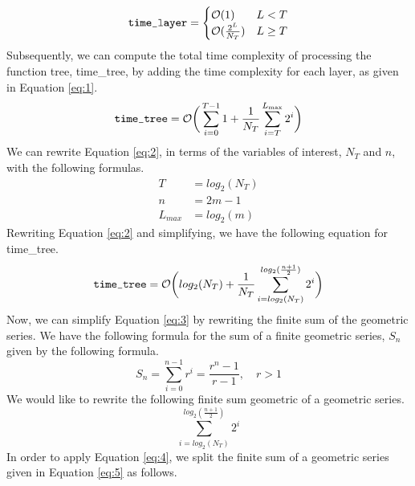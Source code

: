 \documentclass[11pt]{article}
\begin{document}
\begin{enumerate}[leftmargin=0.9in]
\begin{enumerate}[leftmargin=0.3in]
\begin{equation}
               \text{{\fontfamily{cmtt}\selectfont time\_layer}}  = \begin{cases}
                   \mathcal{O}(1) & \text{$L < T$} \\
                   \mathcal{O}(\frac{2^L}{N_T}) & \text{$L \geq T$}
               \end{cases}
           \end{equation}
           Subsequently, we can compute the total time complexity of processing the function tree, {\selectfont time\_tree}, by adding the time complexity for each layer, as given in Equation \ref{eq:1}.
           \begin{equation} \label{eq:2}
               \text{{\fontfamily{cmtt}\selectfont time\_tree}} = \mathcal{O}\bigg(\sum_{i = 0}^{T - 1} 1 + \frac{1}{N_T}\sum_{i = T}^{L_{\text{max}}} 2^i \bigg)
           \end{equation}
           We can rewrite Equation \ref{eq:2}, in terms of the variables of interest, $N_T$ and $n$, with the following formulas.
           \begin{align*}
               T &= log_2(N_T) \\
               n &= 2m - 1 \\ 
               L_{max} &= log_2(m)
           \end{align*}
           Rewriting Equation \ref{eq:2} and simplifying, we have the following equation for {\selectfont time\_tree}.
           \begin{equation} \label{eq:3}
               \text{{\fontfamily{cmtt}\selectfont time\_tree}} = \mathcal{O}\bigg(log_2(N_T) +  \frac{1}{N_T}\sum_{i = log_2(N_T)}^{log_2(\frac{n + 1}{2})} 2^i \bigg)
           \end{equation}
           Now, we can simplify Equation \ref{eq:3} by rewriting the finite sum of the geometric series. We have the following formula for the sum of a finite geometric series, $S_n$ given by the following formula.
           \begin{equation} \label{eq:4}
               S_n = \sum_{i = 0}^{n - 1} r^i = \frac{r^n - 1}{r - 1}, \quad \text{$r > 1$}
           \end{equation}
           We would like to rewrite the following finite sum geometric of a geometric series.
           \begin{equation} \label{eq:5}
               \sum_{i = log_2(N_T)}^{log_2(\frac{n + 1}{2})} 2^i
           \end{equation}
           In order to apply Equation \ref{eq:4}, we split the finite sum of a geometric series given in Equation \ref{eq:5} as follows.

\end{enumerate}
\end{enumerate}
\end{document}
